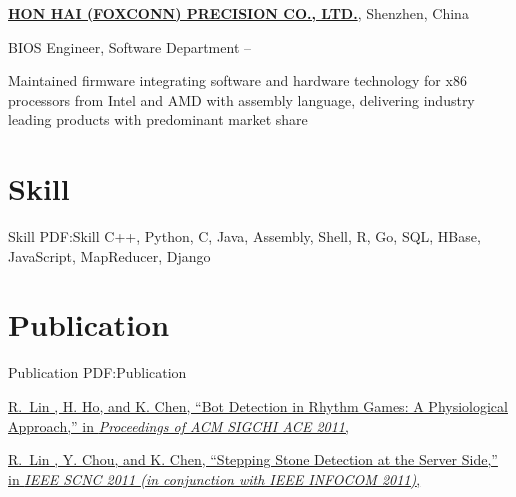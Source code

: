 \documentclass[a4paper,10pt,oneside]{article}
\newcommand{\CVNote}{CV compiled on {\today}}
\begin{document}
\begin{body}
\EntryGap
\href{http://www.foxconn.com.tw/}
{\textbf{HON HAI (FOXCONN) PRECISION CO., LTD.}}, Shenzhen, China
\par
BIOS Engineer, Software Department
\hfill
{} --
\begin{detail}
\BulletItem
Maintained firmware integrating software and hardware technology for x86 processors from Intel and AMD with assembly language, delivering industry leading products with predominant market share
\end{detail}


\section{Skill}
{Skill}
{PDF:Skill}
C++, Python, C, Java, Assembly, Shell, R, Go, SQL, HBase, JavaScript, MapReducer, Django
\section{Publication}
{Publication}
{PDF:Publication}

\href{http://mmnet.iis.sinica.edu.tw/publication_detail.html?key=lin11_rhythm_bots}
{
\underline{R.~Lin} , H. Ho, and K. Chen,
``Bot Detection in Rhythm Games: A Physiological Approach,''
in \textit{Proceedings of ACM SIGCHI ACE 2011},
}

\href{http://mmnet.iis.sinica.edu.tw/publication_detail.html?key=lin11_stepping_stone}
{
\underline{R.~Lin} , Y. Chou, and K. Chen,
``Stepping Stone Detection at the Server Side,''
in \textit{IEEE SCNC 2011 (in conjunction with IEEE INFOCOM 2011)},
}







\end{body}



\end{document}
